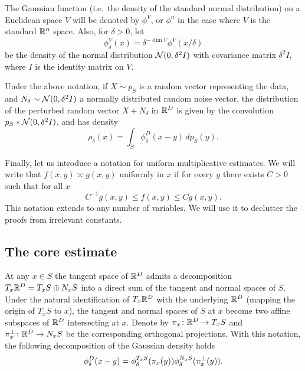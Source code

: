 The Gaussian function (i.e.\ the density of the standard normal distribution) on a Euclidean space $V$ will be denoted by $\phi^V$, or $\phi^n$ in the case where $V$ is the standard $\mathbb{R}^n$ space. Also, for $\delta > 0$, let
\begin{equation}
\label{eq:dilated-gaussian}
    \phi^V_{\delta}(x) = \delta^{-\dim V}\phi^V(x/\delta)
\end{equation} 
be the density of the normal distribution $\mathcal{N}(0, \delta^2 I)$ with covariance matrix $\delta^2 I$, where $I$ is the identity matrix on $V$. 
 
Under the above notation, if $X\sim p_S$ is a random vector representing the data, and $N_\delta\sim\mathcal{N}(0,\delta^2 I)$ a normally distributed random noise vector, the distribution of the perturbed random vector $X+N_\delta$ in $\mathbb{R}^D$ is given by the convolution $p_S * \mathcal{N}(0,\delta^2 I)$, and has density
\begin{equation}
\label{eq:mollified-density}
    \rho_\delta(x) = \int_S \phi^D_{\delta}(x-y)\, d p_S(y).
\end{equation}

Finally, let us introduce a notation for uniform multiplicative estimates. We will write that $f(x,y) \asymp g(x,y)$ uniformly in $x$ if for every $y$ there exists $C>0$ such that for all $x$
\begin{equation}
    C^{-1}g(x,y) \leq f(x,y) \leq Cg(x,y).
\end{equation}
This notation extends to any number of variables. We will use it to declutter the proofs from irrelevant 
constants.


\subsection{The core estimate}
\label{sec:core-estimate}


At any $x\in S$ the tangent space of $\mathbb{R}^D$ admits a decomposition $T_x\mathbb{R}^D = T_xS \oplus N_xS$ into a direct sum of the tangent and normal spaces of $S$. Under the natural identification of $T_x\mathbb{R}^D$ with the underlying $\mathbb{R}^D$ (mapping the origin of $T_xS$ to $x$), the tangent and normal spaces of $S$ at $x$ become two affine subspaces of $\mathbb{R}^D$ intersecting at $x$. Denote by $\pi_x\colon \mathbb{R}^D\to T_xS$ and $\pi^\perp_x\colon \mathbb{R}^D\to N_xS$ be the corresponding orthogonal projections. With this notation, the following decomposition of the Gaussian density holds
\begin{equation}
\label{eq:gaussian-decomposition}
    \phi^D_\delta(x-y) = \phi^{T_xS}_\delta(\pi_x(y)) \phi^{N_xS}_\delta(\pi^\perp_x(y)).
\end{equation}

